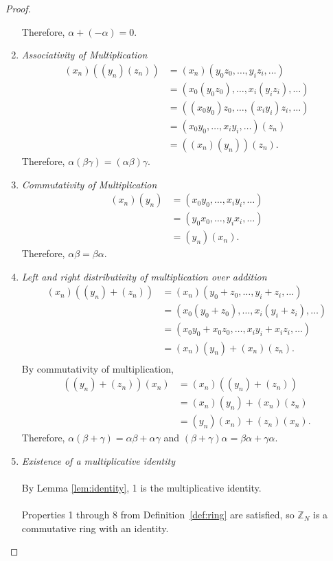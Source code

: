 \documentclass[english]{article}
\def\zzzn{\mathbb{Z}_N}
\def\xn{(x_n)}
\def\yn{(y_n)}
\def\zn{(z_n)}
\theoremstyle{plain}
\theoremstyle{definition}
\theoremstyle{remark}
\begin{document}
\begin{proof}
\begin{enumerate}
      Therefore, $\alpha+(-\alpha)=0$.
    \item {\em Associativity of Multiplication}
      \begin{align*}
        \xn(\yn\zn)&=\xn(y_0z_0,\dots,y_iz_i,\dots) \\
                   &=(x_0(y_0z_0),\dots,x_i(y_iz_i),\dots) \\
                   &=((x_0y_0)z_0,\dots,(x_iy_i)z_i,\dots) \\
                   &=(x_0y_0,\dots,x_iy_i,\dots)\zn \\
                   &=(\xn\yn)\zn.
      \end{align*}
      Therefore, $\alpha(\beta\gamma)=(\alpha\beta)\gamma$.
    \setcounter{enumi}{6}
    \item {\em Commutativity of Multiplication}
      \begin{align*}
        \xn\yn&=(x_0y_0,\dots,x_iy_i,\dots) \\
              &=(y_0x_0,\dots,y_ix_i,\dots) \\
              &=\yn\xn.
      \end{align*}
      Therefore, $\alpha\beta=\beta\alpha$.
    \setcounter{enumi}{5}
    \item {\em Left and right distributivity of multiplication over addition}
      \begin{align*}
        \xn(\yn+\zn)&=\xn(y_0+z_0,\dots,y_i+z_i,\dots) \\
                    &=(x_0(y_0+z_0),\dots,x_i(y_i+z_i),\dots) \\
                    &=(x_0y_0+x_0z_0,\dots,x_iy_i+x_iz_i,\dots) \\
                    &=\xn\yn+\xn\zn. \\
      \end{align*}
      By commutativity of multiplication,
      \begin{align*}
        (\yn+\zn)\xn&=\xn(\yn+\zn)\\
                    &=\xn\yn+\xn\zn\\
                    &=\yn\xn+\zn\xn.
      \end{align*}
      Therefore, $\alpha(\beta+\gamma)=\alpha\beta+\alpha\gamma$ and
      $(\beta+\gamma)\alpha=\beta\alpha+\gamma\alpha$.
    \setcounter{enumi}{7}
    \item {\em Existence of a multiplicative identity}
      \\ \\
      By Lemma \ref{lem:identity}, 1 is the multiplicative identity.
      \\ \\
      Properties 1 through 8 from Definition~\ref{def:ring} are satisfied,
      so $\zzzn$ is a commutative ring with an identity.
  \end{enumerate}
\end{proof}
\end{document}
